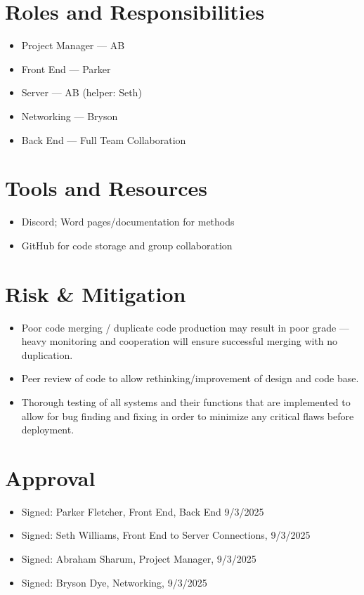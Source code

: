 \documentclass[10pt,titlepage]{article}
\begin{document}
    
    
	\section*{Roles and Responsibilities}
	\begin{itemize}
		\item Project Manager --- AB
		\item Front End --- Parker
		\item Server --- AB (helper: Seth)
		\item Networking --- Bryson
		\item Back End --- Full Team Collaboration
	\end{itemize}
	
	\section*{Tools and Resources}
	\begin{itemize}
		\item Discord; Word pages/documentation for methods
		\item GitHub for code storage and group collaboration
	\end{itemize}
	
	\section*{Risk \& Mitigation}
	\begin{itemize}
		\item Poor code merging / duplicate code production may result in poor grade --- heavy monitoring and cooperation will ensure successful merging with no duplication.
		\item Peer review of code to allow rethinking/improvement of design and code base.
        \item Thorough testing of all systems and their functions that are implemented to allow for bug finding and fixing in order to minimize any critical flaws before deployment.
	\end{itemize}
	
	\section*{Approval}
	\begin{itemize}
		\item Signed: Parker Fletcher, Front End, Back End 9/3/2025
		\item Signed: Seth Williams, Front End to Server Connections, 9/3/2025
		\item Signed: Abraham Sharum, Project Manager, 9/3/2025
		\item Signed: Bryson Dye, Networking, 9/3/2025
	\end{itemize}
	
\end{document}
